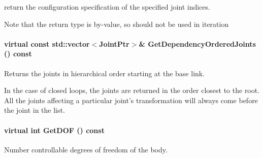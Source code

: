 return the configuration specification of the specified joint indices. 

Note that the return type is by-\/value, so should not be used in iteration \hypertarget{classOpenRAVE_1_1KinBody_a23704d633d23272f467ea0a2ca5a5223}{
\paragraph[{GetDependencyOrderedJoints}]{\setlength{\rightskip}{0pt plus 5cm}virtual const std::vector$<$JointPtr$>$\& GetDependencyOrderedJoints () const}\hfill}
\label{classOpenRAVE_1_1KinBody_a23704d633d23272f467ea0a2ca5a5223}


Returns the joints in hierarchical order starting at the base link. 

In the case of closed loops, the joints are returned in the order closest to the root. All the joints affecting a particular joint's transformation will always come before the joint in the list. \hypertarget{classOpenRAVE_1_1KinBody_a44fbec2fd26a45cada889c5c0f0751c8}{
\paragraph[{GetDOF}]{\setlength{\rightskip}{0pt plus 5cm}virtual int GetDOF () const}\hfill}
\label{classOpenRAVE_1_1KinBody_a44fbec2fd26a45cada889c5c0f0751c8}


Number controllable degrees of freedom of the body. 

